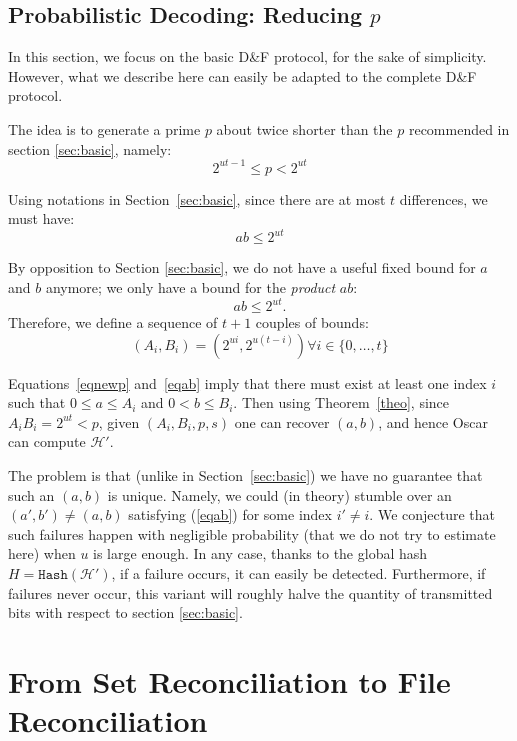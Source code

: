 \documentclass[11pt]{llncs}
\newcommand{\Set}{\mathcal{H}}
\newcommand{\df}{D\&F\xspace}
\newcommand{\Hash}{\ensuremath{\mathtt{Hash}}}
\begin{document}
\subsection{Probabilistic Decoding: Reducing $p$}

In this section, we focus on the basic \df protocol, for the sake of simplicity.
However, what we describe here can easily be adapted to the complete \df protocol.

The idea is to generate a prime $p$ about twice shorter than the $p$ recommended in section \ref{sec:basic}, namely:
\begin{equation}
\label{eqnewp}
2^{ut-1}\leq p < 2^{ut}
\end{equation}

Using notations in Section~\ref{sec:basic}, since there are at most $t$ differences, we must have:
\begin{equation}
\label{eqab}
a b \leq 2^{ut}
\end{equation}

By opposition to Section \ref{sec:basic}, we do not have a useful fixed bound for $a$ and $b$ anymore; we only have a bound for the \textit{product} $a b$: 
\begin{equation}
\label{eqab}
ab \leq 2^{ut}.
\end{equation} 
Therefore, we define a sequence of $t+1$ couples of bounds:
\[\left(A_i, B_i\right) = \left(2^{ui}, 2^{u(t-i)}\right) \forall i \in \{0,\dots,t\} \]

Equations~\eqref{eqnewp} and~\eqref{eqab} imply that there must exist at least one index $i$ such that $0 \leq a \leq A_i$ and $0 <b \leq B_i$. 
Then using Theorem~\ref{theo}, since $A_i B_i = 2^{ut} < p$, given $(A_i,B_i,p,s)$ one can recover $(a,b)$, and hence Oscar can compute $\Set'$.

The problem is that (unlike in Section~\ref{sec:basic}) we have no guarantee that such an $(a,b)$ is unique. Namely, we could (in theory) stumble over an $(a',b')\neq (a,b)$ satisfying (\ref{eqab}) for some index $i' \neq i$. We conjecture that such failures happen with negligible probability (that we do not try to estimate here) when $u$ is large enough.
In any case, thanks to the global hash $H = \Hash(\Set')$, if a failure occurs, it can easily be detected.
Furthermore, if failures never occur, this variant will roughly halve the quantity of transmitted bits with respect to section \ref{sec:basic}.

\section{From Set Reconciliation to File Reconciliation}
\label{hashing}
\end{document}
